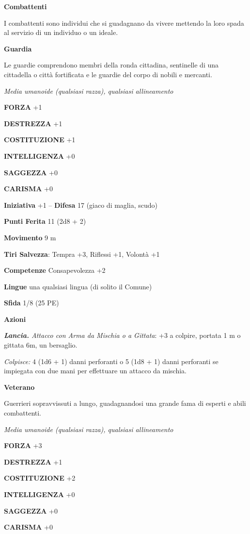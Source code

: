 \begin{multicols}{2}
\textbf{Combattenti}

I combattenti sono individui che si guadagnano da vivere mettendo la loro spada al servizio di un individuo o un ideale.

\medskip\textbf{Guardia}

Le guardie comprendono membri della ronda cittadina, sentinelle di una cittadella o città fortificata e le guardie del corpo di nobili e mercanti.

\emph{Media umanoide (qualsiasi razza), qualsiasi allineamento} 

\textbf{FORZA} +1

\textbf{DESTREZZA} +1

\textbf{COSTITUZIONE} +1

\textbf{INTELLIGENZA} +0

\textbf{SAGGEZZA} +0

\textbf{CARISMA} +0

\textbf{Iniziativa} +1 -- \textbf{Difesa} 17 (giaco di maglia, scudo)

\textbf{Punti Ferita} 11 (2d8 + 2)

\textbf{Movimento} 9 m

\textbf{Tiri Salvezza}: Tempra +3, Riflessi +1, Volontà +1 

\textbf{Competenze} Consapevolezza +2


\textbf{Lingue} una qualsiasi lingua (di solito il Comune)

\textbf{Sfida} 1/8 (25 PE)

\textbf{Azioni}

\emph{\textbf{Lancia.} Attacco con Arma da Mischia o a Gittata}: +3 a colpire, portata 1 m o gittata 6m, un bersaglio.

\emph{Colpisce:} 4 (1d6 + 1) danni perforanti o 5 (1d8 + 1) danni perforanti se impiegata con due mani per effettuare un attacco da mischia.

\medskip\textbf{Veterano}

Guerrieri sopravvissuti a lungo, guadagnandosi una grande fama di esperti e abili combattenti.

\emph{Media umanoide (qualsiasi razza), qualsiasi allineamento}

\textbf{FORZA} +3

\textbf{DESTREZZA} +1

\textbf{COSTITUZIONE} +2

\textbf{INTELLIGENZA} +0

\textbf{SAGGEZZA} +0

\textbf{CARISMA} +0


\end{multicols}
